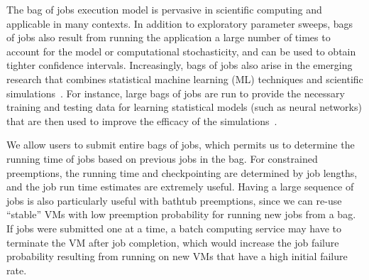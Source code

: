 The bag of jobs execution model is pervasive in scientific computing and applicable in many contexts.
In addition to exploratory parameter sweeps, bags of jobs also result from running the application a large number of times to account for the model or computational stochasticity, and can be used to obtain tighter confidence intervals. 
Increasingly, bags of jobs also arise in the emerging research that combines statistical machine learning (ML) techniques and scientific simulations~\cite{ml.atomic2017,melko2017,sam2017}. %
For instance, large bags of jobs are run to provide the necessary training and testing data for learning statistical models (such as neural networks) that are then used to improve the efficacy of the simulations~\cite{jcs2}.

We allow users to submit entire bags of jobs, which permits us to determine the running time of jobs based on previous jobs in the bag.
For constrained preemptions, the running time and checkpointing are determined by job lengths, and the job run time estimates are extremely useful. 
Having a large sequence of jobs is also particularly useful with bathtub preemptions, since we can re-use ``stable'' VMs with low preemption probability for running new jobs from a bag.
If jobs were submitted one at a time, a batch computing service may have to terminate the VM after job completion, which would increase the job failure probability resulting from running on new VMs that have a high initial failure rate. 








